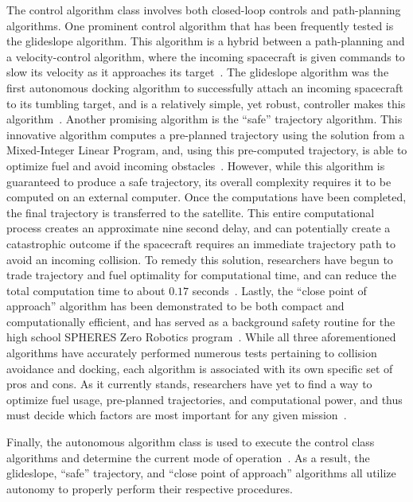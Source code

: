 \documentclass[onecolumn,10pt]{jhwhw}
\begin{document}
The control algorithm class involves both closed-loop controls and path-planning algorithms. One prominent control algorithm that has been frequently tested is the glideslope algorithm. This algorithm is a hybrid between a path-planning and a velocity-control algorithm, where the incoming spacecraft is given commands to slow its velocity as it approaches its target~\cite{SPHERES_form,SPHERES_micro,dist,virt_sim}. The glideslope algorithm was the first autonomous docking algorithm to successfully attach an incoming spacecraft to its tumbling target, and is a relatively simple, yet robust, controller makes this algorithm~\cite{SPHERES_micro}. Another promising algorithm is the ``safe'' trajectory algorithm. This innovative algorithm computes a pre-planned trajectory using the solution from a Mixed-Integer Linear Program, and, using this pre-computed trajectory, is able to optimize fuel and avoid incoming obstacles~\cite{SPHERES_micro}. However, while this algorithm is guaranteed to produce a safe trajectory, its overall complexity requires it to be computed on an external computer. Once the computations have been completed, the final trajectory is transferred to the satellite. This entire computational process creates an approximate nine second delay, and can potentially create a catastrophic outcome if the spacecraft requires an immediate trajectory path to avoid an incoming collision. To remedy this solution, researchers have begun to trade trajectory and fuel optimality for computational time, and can reduce the total computation time to about $0.17$ seconds~\cite{SPHERES_micro}. Lastly, the ``close point of approach'' algorithm has been demonstrated to be both compact and computationally efficient, and has served as a background safety routine for the high school SPHERES Zero Robotics program~\cite{virt_sim}. While all three aforementioned algorithms have accurately performed numerous tests pertaining to collision avoidance and docking, each algorithm is associated with its own specific set of pros and cons. As it currently stands, researchers have yet to find a way to optimize fuel usage, pre-planned trajectories, and computational power, and thus must decide which factors are most important for any given mission~\cite{SPHERES_form,SPHERES_micro,dist,virt_sim}.

Finally, the autonomous algorithm class is used to execute the control class algorithms and determine the current mode of operation~\cite{SPHERES_form}. As a result, the glideslope, ``safe'' trajectory, and ``close point of approach'' algorithms all utilize autonomy to properly perform their respective procedures.
\end{document}
